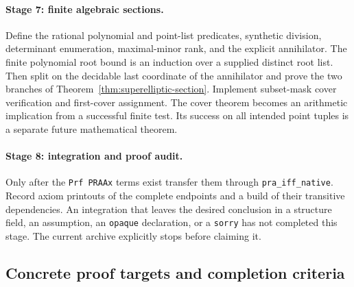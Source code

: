 \paragraph{Stage 7: finite algebraic sections.}
Define the rational polynomial and point-list predicates, synthetic
division, determinant enumeration, maximal-minor rank, and the explicit
annihilator. The finite polynomial root bound is an induction over a
supplied distinct root list. Then split on the decidable last coordinate
of the annihilator and prove the two branches of
Theorem~\ref{thm:superelliptic-section}. Implement subset-mask cover
verification and first-cover assignment. The cover theorem becomes an
arithmetic implication from a successful finite test. Its success on
all intended point tuples is a separate future mathematical theorem.

\paragraph{Stage 8: integration and proof audit.}
Only after the \texttt{Prf PRAAx} terms exist transfer them through
\texttt{pra\_iff\_native}. Record axiom printouts of the complete
endpoints and a build of their transitive dependencies. An integration
that leaves the desired conclusion in a structure field, an assumption,
an \texttt{opaque} declaration, or a \texttt{sorry} has not completed
this stage. The current archive explicitly stops before claiming it.

\subsection{Concrete proof targets and completion criteria}

